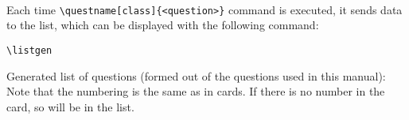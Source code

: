 \documentclass{examcard}
\begin{document}
\begin{card}
\blindtext
\end{card}
\begin{card}
\blindtext
\end{card}
\begin{card}
\blindtext
\end{card}\\

Each time \verb=\questname[class]{<question>}= command is executed, it sends data to the list, which can be displayed with the following command:
\begin{verbatim} 
\listgen
\end{verbatim}
Generated list of questions (formed out of the questions used in this manual):
\listgen
Note that the numbering is the same as in cards. If there is no number in the card, so will be in the list.
\end{document}
